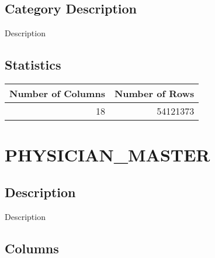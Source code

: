 \documentclass[
  letterpaper,
  DIV=11,
  numbers=noendperiod]{scrreprt}
\begin{document}
\hypertarget{category-description-32}{%
\section*{Category Description}\label{category-description-32}}

Description

\hypertarget{statistics-32}{%
\section*{Statistics}\label{statistics-32}}

\begin{longtable}{rr}
\toprule
Number of Columns & Number of Rows \\ 
\midrule
18 & 54121373 \\ 
\bottomrule
\end{longtable}

\hypertarget{physician_master}{%
\chapter*{PHYSICIAN\_MASTER}\label{physician_master}}

\hypertarget{description-33}{%
\section*{Description}\label{description-33}}

Description

\hypertarget{columns-33}{%
\section*{Columns}\label{columns-33}}
\end{document}
